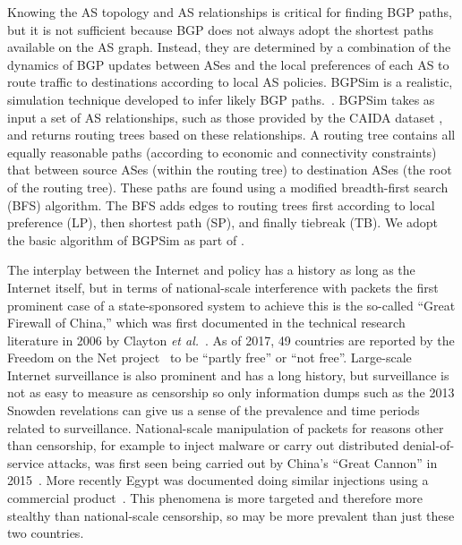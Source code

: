 \par Knowing the AS topology and AS relationships is critical for finding BGP paths, but it is not sufficient because BGP does not always adopt
the shortest paths available on the
AS graph. Instead, they are determined by a combination of the dynamics of
BGP updates between ASes and the local preferences of each AS to route traffic
to destinations according to local AS policies.
BGPSim is a realistic, simulation technique developed to infer likely BGP paths.~\cite{quicksand}. BGPSim takes as input a set of AS
relationships, such as those provided by the CAIDA dataset
\cite{CAIDA}, and returns routing trees based on these
relationships. A routing tree contains all
equally reasonable paths (according to economic and connectivity constraints) that between source ASes (within the routing tree) to destination ASes (the
root of the routing tree). These paths are found using a modified breadth-first
search (BFS) algorithm. The BFS adds edges to routing trees first
according to local preference (LP), then shortest path (SP), and
finally tiebreak (TB).
We adopt the basic algorithm of BGPSim
as part of \toolname{}.


The interplay between the Internet and policy has a history as long as the
Internet itself, but in terms of national-scale interference with packets the
first prominent case of a state-sponsored system to achieve this is the
so-called ``Great Firewall of China,'' which was first documented in the
technical research literature in 2006 by Clayton \emph{et
al.}~\cite{Clayton:2006:IGF:2166520.2166523}.  As of 2017, 49 countries are
reported by the Freedom on the Net project~\cite{FOTN} to be ``partly free'' or
``not free''.  Large-scale Internet surveillance is also prominent and has a
long history, but surveillance is not as easy to measure as censorship so only
information dumps such as the 2013 Snowden revelations can give us a sense of
the prevalence and time periods related to surveillance.  National-scale
manipulation of packets for reasons other than censorship, for example to inject
malware or carry out distributed denial-of-service attacks, was first seen being
carried out by China's ``Great Cannon'' in 2015~\cite{badtraffic}.  More
recently Egypt was documented doing similar injections using a commercial
product~\cite{191996}.  This phenomena is more targeted and therefore more
stealthy than national-scale censorship, so may be more prevalent than just
these two countries.
